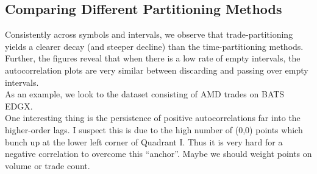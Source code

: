 \documentclass{article}
\begin{document}
\subsection{Comparing Different Partitioning Methods}
Consistently across symbols and intervals, we observe that trade-partitioning yields a clearer decay (and steeper decline) than the time-partitioning methods. Further, the figures reveal that when there is a low rate of empty intervals, the autocorrelation plots are very similar between discarding and passing over empty intervals.\\

As an example, we look to the dataset consisting of AMD trades on BATS EDGX.\\

One interesting thing is the persistence of positive autocorrelations far into the higher-order lags. I suspect this is due to the high number of (0,0) points which bunch up at the lower left corner of Quadrant I. Thus it is very hard for a negative correlation to overcome this ``anchor''. Maybe we should weight points on volume or trade count.
\end{document}
